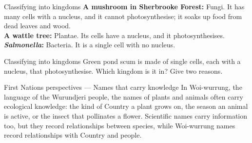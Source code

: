 \begin{center}
\end{center}

\begin{workedex}{Classifying into kingdoms}
\textbf{A mushroom in Sherbrooke Forest:} Fungi. It has many cells with a nucleus, and it cannot photosynthesise; it soaks up food from dead leaves and wood.\\
\textbf{A wattle tree:} Plantae. Its cells have a nucleus, and it photosynthesises.\\
\textbf{\textit{Salmonella}:} Bacteria. It is a single cell with no nucleus.
\end{workedex}

\begin{wedo}{Classifying into kingdoms}
Green pond scum is made of single cells, each with a nucleus, that photosynthesise. Which kingdom is it in? Give two reasons.
\answerbox{4cm}
\end{wedo}

\begin{countrybox}{First Nations perspectives --- Names that carry knowledge}
In Woi-wurrung, the language of the Wurundjeri people, the names of plants and animals often carry ecological knowledge: the kind of Country a plant grows on, the season an animal is active, or the insect that pollinates a flower. Scientific names carry information too, but they record relationships between species, while Woi-wurrung names record relationships with Country and people.
\end{countrybox}

